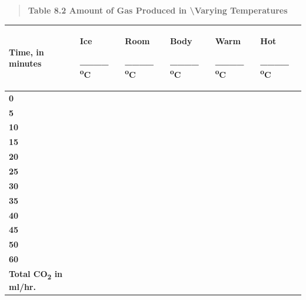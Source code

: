 \documentclass[
  letterpaper,
  DIV=11,
  numbers=noendperiod]{scrreprt}
\newcounter{none} %
\begin{document}
\begin{quote}
\textbf{Table 8.2 Amount of Gas Produced in \textbackslash Varying
Temperatures}
\end{quote}

{\def\LTcaptype{none} %
\begin{longtable}[]{@{}
  >{\centering\arraybackslash}p{}
  >{\raggedright\arraybackslash}p{}
  >{\raggedright\arraybackslash}p{}
  >{\raggedright\arraybackslash}p{}
  >{\raggedright\arraybackslash}p{}
  >{\raggedright\arraybackslash}p{}@{}}
\toprule\noalign{}
\begin{minipage}[b]{\linewidth}\centering
\textbf{Time, in minutes}
\end{minipage} & \begin{minipage}[b]{\linewidth}\raggedright
\textbf{Ice}

\textbf{\_\_\_\_ \textsuperscript{o}C}
\end{minipage} & \begin{minipage}[b]{\linewidth}\raggedright
\textbf{Room}

\textbf{\_\_\_\_ \textsuperscript{o}C}
\end{minipage} & \begin{minipage}[b]{\linewidth}\raggedright
\textbf{Body}

\textbf{\_\_\_\_ \textsuperscript{o}C}
\end{minipage} & \begin{minipage}[b]{\linewidth}\raggedright
\textbf{Warm}

\textbf{\_\_\_\_ \textsuperscript{o}C}
\end{minipage} & \begin{minipage}[b]{\linewidth}\raggedright
\textbf{Hot}

\textbf{\_\_\_\_ \textsuperscript{o}C}
\end{minipage} \\
\midrule\noalign{}
\endhead
\bottomrule\noalign{}
\endlastfoot
\textbf{0} & & & & & \\
\textbf{5} & & & & & \\
\textbf{10} & & & & & \\
\textbf{15} & & & & & \\
\textbf{20} & & & & & \\
\textbf{25} & & & & & \\
\textbf{30} & & & & & \\
\textbf{35} & & & & & \\
\textbf{40} & & & & & \\
\textbf{45} & & & & & \\
\textbf{50} & & & & & \\
\textbf{60} & & & & & \\
\textbf{Total CO\textsubscript{2} in ml/hr.} & & & & & \\
\end{longtable}
}
\end{document}
